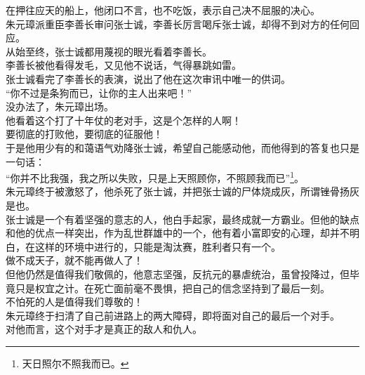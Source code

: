 \begin{multicols}{\theparacolNo}
在押往应天的船上，他闭口不言，也不吃饭，表示自己决不屈服的决心。\\

朱元璋派重臣李善长审问张士诚，李善长厉言喝斥张士诚，却得不到对方的任何回应。\\

从始至终，张士诚都用蔑视的眼光看着李善长。\\

李善长被他看得发毛，又见他不说话，气得暴跳如雷。\\

张士诚看完了李善长的表演，说出了他在这次审讯中唯一的供词。\\

“你不过是条狗而已，让你的主人出来吧！”\\

没办法了，朱元璋出场。\\

他看着这个打了十年仗的老对手，这是个怎样的人啊！\\

要彻底的打败他，要彻底的征服他！\\

于是他用少有的和蔼语气劝降张士诚，希望自己能感动他，而他得到的答复也只是一句话：\\

“你并不比我强，我之所以失败，只是上天照顾你，不照顾我而已”\footnote{天日照尔不照我而已。}。\\

朱元璋终于被激怒了，他杀死了张士诚，并把张士诚的尸体烧成灰，所谓锉骨扬灰是也。\\

张士诚是一个有着坚强的意志的人，他白手起家，最终成就一方霸业。但他的缺点和他的优点一样突出，作为乱世群雄中的一个，他有着小富即安的心理，却并不明白，在这样的环境中进行的，只能是淘汰赛，胜利者只有一个。\\

做不成天子，就不能再做人了！\\

但他仍然是值得我们敬佩的，他意志坚强，反抗元的暴虐统治，虽曾投降过，但毕竟只是权宜之计。在死亡面前毫不畏惧，把自己的信念坚持到了最后一刻。\\

不怕死的人是值得我们尊敬的！\\

朱元璋终于扫清了自己前进路上的两大障碍，即将面对自己的最后一个对手。\\

对他而言，这个对手才是真正的敌人和仇人。\\
\ifnum{}
	\end{multicols}
\fi
\newpage

